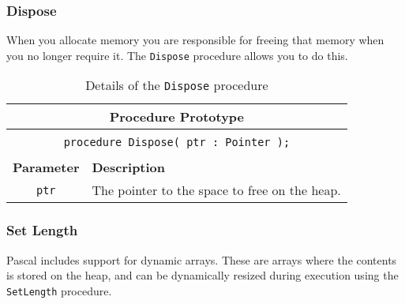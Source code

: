 \clearpage
\subsubsection{Dispose} %
\label{ssub:dispose}

When you allocate memory you are responsible for freeing that memory when you no longer require it. The \texttt{Dispose} procedure allows you to do this. 

\begin{table}[h]
  \centering
  \begin{tabular}{|c|p{9.5cm}|}
    \hline
    \multicolumn{2}{|c|}{\textbf{Procedure Prototype}} \\
    \hline
    \multicolumn{2}{|c|}{} \\
    \multicolumn{2}{|c|}{\texttt{procedure Dispose( ptr : Pointer );}} \\
    \multicolumn{2}{|c|}{} \\
    \hline
    \textbf{Parameter} & \textbf{Description} \\
    \hline
    \texttt{ ptr } & The pointer to the space to free on the heap.\\
    \hline
  \end{tabular}
  \caption{Details of the \texttt{Dispose} procedure}
  \label{tbl:dispose}
\end{table}



\clearpage
\subsubsection{Set Length} %
\label{ssub:set_length}

Pascal includes support for dynamic arrays. These are arrays where the contents is stored on the heap, and can be dynamically resized during execution using the \texttt{SetLength} procedure.

